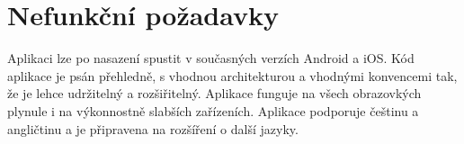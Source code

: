 \section{Nefunkční požadavky}

\blind[1]

\begin{enumerate}[label=\textbf{N\arabic*}, ref=N\arabic*]
Aplikaci lze po nasazení spustit v současných verzích Android a iOS.
Kód aplikace je psán přehledně,
s vhodnou architekturou a vhodnými konvencemi tak,
že je lehce udržitelný a rozšiřitelný.
Aplikace funguje na všech obrazovkých plynule
i na výkonnostně slabších zařízeních.
Aplikace podporuje češtinu a angličtinu
a je připravena na rozšíření o další jazyky.
\end{enumerate}

